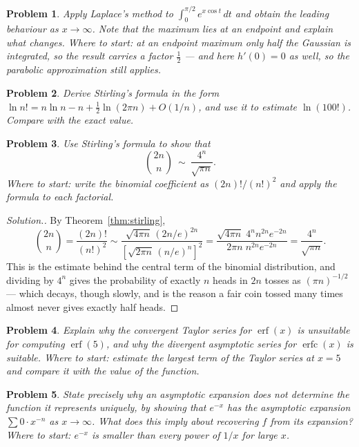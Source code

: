 \documentclass[12pt,a4paper]{report}
\theoremstyle{definition}
\theoremstyle{plain}
\newtheorem{problemx}{Problem}[section]
\newenvironment{problem}{\begin{problemx}}{\end{problemx}}
\newenvironment{solution}
  {\renewcommand{\qedsymbol}{}\begin{proof}[\textit{Solution}.]}
  {\end{proof}}
\begin{document}
\begin{problem}
Apply Laplace's method to $\displaystyle\int^{\pi/2}_{0}e^{x\cos t}\,dt$ and
obtain the leading behaviour as $x\to\infty$. Note that the maximum lies at an
endpoint and explain what changes.
\emph{Where to start: at an endpoint maximum only half the Gaussian is
integrated, so the result carries a factor $\tfrac12$ --- and here $h'(0)=0$ as
well, so the parabolic approximation still applies.}
\end{problem}

\begin{problem}
Derive Stirling's formula in the form $\ln n! = n\ln n - n + \tfrac12\ln(2\pi n)
+ O(1/n)$, and use it to estimate $\ln(100!)$. Compare with the exact value.
\end{problem}

\begin{problem}
Use Stirling's formula to show that
$$\binom{2n}{n}\ \sim\ \frac{4^{n}}{\sqrt{\pi n}} .$$
\emph{Where to start: write the binomial coefficient as $(2n)!/(n!)^{2}$ and
apply the formula to each factorial.}
\end{problem}

\begin{solution}
By Theorem~\ref{thm:stirling},
$$\binom{2n}{n} = \frac{(2n)!}{(n!)^{2}}
\sim \frac{\sqrt{4\pi n}\,(2n/e)^{2n}}{\left[\sqrt{2\pi n}\,(n/e)^{n}\right]^{2}}
= \frac{\sqrt{4\pi n}\;4^{n}n^{2n}e^{-2n}}{2\pi n\;n^{2n}e^{-2n}}
= \frac{4^{n}}{\sqrt{\pi n}} .$$
This is the estimate behind the central term of the binomial distribution, and
dividing by $4^{n}$ gives the probability of exactly $n$ heads in $2n$ tosses as
$\left(\pi n\right)^{-1/2}$ --- which decays, though slowly, and is the reason a
fair coin tossed many times almost never gives exactly half heads.
\end{solution}

\begin{problem}
Explain why the convergent Taylor series for $\operatorname{erf}(x)$ is
unsuitable for computing $\operatorname{erf}(5)$, and why the divergent
asymptotic series for $\operatorname{erfc}(x)$ is suitable.
\emph{Where to start: estimate the largest term of the Taylor series at $x=5$
and compare it with the value of the function.}
\end{problem}

\begin{problem}
State precisely why an asymptotic expansion does not determine the function it
represents uniquely, by showing that $e^{-x}$ has the asymptotic expansion
$\sum 0\cdot x^{-n}$ as $x\to\infty$. What does this imply about recovering $f$
from its expansion?
\emph{Where to start: $e^{-x}$ is smaller than every power of $1/x$ for large
$x$.}
\end{problem}
\end{document}
